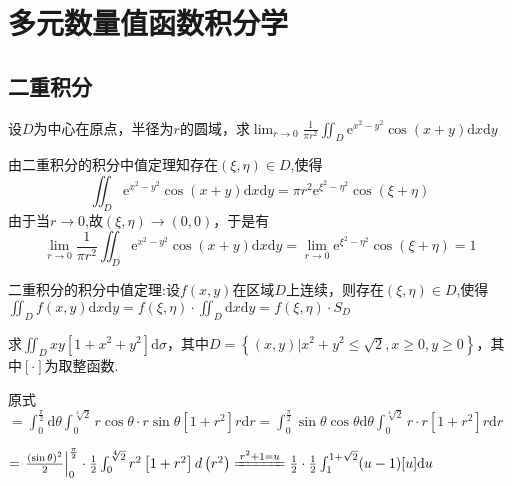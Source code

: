 \chapter{多元数量值函数积分学}\label{cha:5}
\section{二重积分}%
\begin{xiti}
	\item 设$D$为中心在原点，半径为$r$的圆域，求$\lim _{r \rightarrow 0} \frac{1}{\pi r^{2}} \iint_{D} \mathrm{e}^{x^{2}-y^{2}} \cos (x+y) \mathrm{d} x \mathrm{d} y$
	\begin{solution}
		由二重积分的积分中值定理知存在$(\xi, \eta) \in D$,使得
		\[\iint_{D} \mathrm{e}^{x^{2}-y^{2}} \cos (x+y) \mathrm{d} x \mathrm{d} y=\pi r^{2} \mathrm{e}^{\xi^{2}-\eta^{2}} \cos (\xi+\eta)\]由于当$r \rightarrow 0$,故$(\xi, \eta) \rightarrow(0,0)$，于是有\[\lim _{r \rightarrow 0} \frac{1}{\pi r^{2}} \iint_{D} \mathrm{e}^{x^{2}-y^{2}} \cos (x+y) \mathrm{d} x \mathrm{d} y=\lim _{r \rightarrow 0} \mathrm{e}^{\xi^{2}-\eta^{2}} \cos (\xi+\eta)=1\]
		\begin{note}
			二重积分的积分中值定理:设$f(x,y)$在区域$D$上连续，则存在$(\xi, \eta) \in D$,使得$\iint_{D} f(x,y) \mathrm{d} x \mathrm{d} y= f(\xi,\eta) \cdot \iint_{D} \mathrm{d} x \mathrm{d} y= f(\xi,\eta) \cdot S_{D}$
		\end{note}
	\end{solution}
	\item 求$\iint_{D} x y\left[1+x^{2}+y^{2}\right] \mathrm{d} \sigma$，其中$D=\left\{(x, y) | x^{2}+y^{2} \leqslant \sqrt{2}, x \geqslant 0, y \geqslant 0\right\}$，其中$[\cdot]$为取整函数.
	\begin{solution}
		原式$=\int_{0}^{\frac{\pi}{2}} \mathrm{d} \theta \int_{0}^{\sqrt[4]{2}} r \cos \theta \cdot r \sin \theta\left[1+r^{2}\right] r \mathrm{d} r=\int_{0}^{\frac{\pi}{2}} \sin \theta \cos \theta \mathrm{d} \theta \int_{0}^{\sqrt[4]{2}} r \cdot r\left[1+r^{2}\right] r \mathrm{d} r$
		
		$=\left.\frac{(\sin \theta)^{2}}{2}\right|_{0} ^{\frac{\pi}{2}} \cdot \frac{1}{2} \int_{0}^{\sqrt[4]{2}} r^{2}\left[1+r^{2}\right]d\left(r^{2}\right) \xlongequal{{r^2} + 1 = u} \frac{1}{2} \cdot \frac{1}{2} \int_{1}^{1+\sqrt{2}}(u-1)[u] \mathrm{d} u $
				

\end{solution}
\end{xiti}
